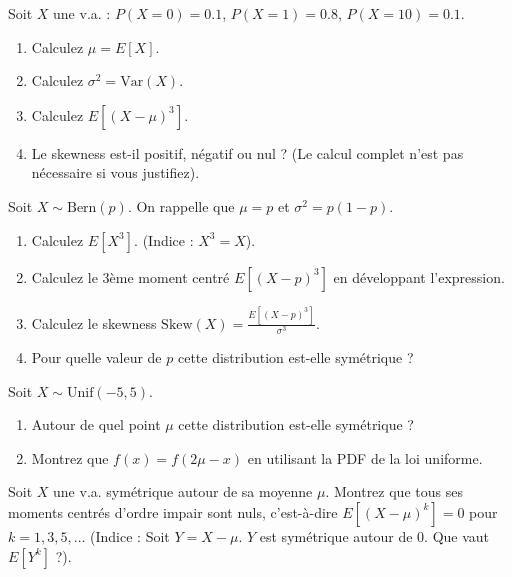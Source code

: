 \begin{exercicebox}
Soit $X$ une v.a. : $P(X=0)=0.1$, $P(X=1)=0.8$, $P(X=10)=0.1$.
\begin{enumerate}
    \item Calculez $\mu = E[X]$.
    \item Calculez $\sigma^2 = \text{Var}(X)$.
    \item Calculez $E[(X-\mu)^3]$.
    \item Le skewness est-il positif, négatif ou nul ? (Le calcul complet n'est pas nécessaire si vous justifiez).
\end{enumerate}
\end{exercicebox}

\begin{exercicebox}
Soit $X \sim \text{Bern}(p)$. On rappelle que $\mu = p$ et $\sigma^2 = p(1-p)$.
\begin{enumerate}
    \item Calculez $E[X^3]$. (Indice : $X^3 = X$).
    \item Calculez le 3ème moment centré $E[(X-p)^3]$ en développant l'expression.
    \item Calculez le skewness $\text{Skew}(X) = \frac{E[(X-p)^3]}{\sigma^3}$.
    \item Pour quelle valeur de $p$ cette distribution est-elle symétrique ?
\end{enumerate}
\end{exercicebox}


\begin{exercicebox}
Soit $X \sim \text{Unif}(-5, 5)$.
\begin{enumerate}
    \item Autour de quel point $\mu$ cette distribution est-elle symétrique ?
    \item Montrez que $f(x) = f(2\mu - x)$ en utilisant la PDF de la loi uniforme.
\end{enumerate}
\end{exercicebox}

\begin{exercicebox}
Soit $X$ une v.a. symétrique autour de sa moyenne $\mu$.
Montrez que tous ses moments centrés d'ordre impair sont nuls, c'est-à-dire $E[(X-\mu)^k] = 0$ pour $k=1, 3, 5, \dots$
(Indice : Soit $Y = X-\mu$. $Y$ est symétrique autour de 0. Que vaut $E[Y^k]$ ?).
\end{exercicebox}

